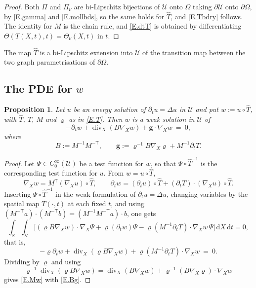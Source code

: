 \documentclass[10pt,a4paper]{amsart}
\numberwithin{equation}{section}
\DeclareMathOperator{\divg}{div}
\newcommand{\R}{\mathbb R}
\newcommand{\br}[1]{\left(#1\right)}
\newcommand{\om}{\Omega}
\newcommand{\pom}{\partial\Omega}
\newcommand{\pd}{\partial}
\newcommand{\Uc}{\mathcal U}
\renewcommand{\d}{\,\mathrm d}
\newtheorem{proposition}[equation]{Proposition}
\begin{document}
\begin{proof}
Both $\Pi$ and $\Pi_\nu$ are bi-Lipschitz bijections of $\Uc$ onto $\om$ taking
$\pd\Uc$ onto $\pom$, by \eqref{E.gamma} and \eqref{E.mollbds}, so the same
holds for $\widehat T$, and \eqref{E.Tbdry} follows. The identity for $M$ is the chain
rule, and \eqref{E.dtT} is obtained by differentiating
$\Theta\br{T(X,t),t}=\Theta_\nu(X,t)$ in $t$.
\end{proof}

\noindent The map $\widehat T$ is a bi-Lipschitz extension into $\Uc$ of the transition
map between the two graph parametrisations of $\pom$.

\subsection{The PDE for $w$}\label{ss.pde}

\begin{proposition}\label{P.pde}
Let $u$ be an energy solution of $\pd_tu=\Delta u$ in $\Uc$ and put
$w:=u\circ\widehat T$, with $\widehat T$, $T$, $M$ and $\varrho$ as in
\eqref{E.T}. Then $w$ is a weak solution in $\Uc$ of
\begin{equation}\label{E.Mw}
  -\pd_tw+\divg_X\br{B\nabla_Xw}+\mathbf g\cdot\nabla_Xw\ =\ 0 ,
\end{equation}
where
\begin{equation}\label{E.Bg}
  B:=M^{-1}M^{-\mathsf T},\qquad
  \mathbf g:=\varrho^{-1}B\nabla_X\varrho+M^{-1}\pd_tT .
\end{equation}
\end{proposition}

\begin{proof}
Let $\Psi\in C^\infty_0(\Uc)$ be a test function for $w$, so that
$\Psi\circ\widehat T^{-1}$ is the corresponding test function for $u$. From
$w=u\circ\widehat T$,
$$\nabla_Xw=M^{\mathsf T}\br{\nabla_Xu}\circ\widehat T,\qquad
  \pd_tw=\br{\pd_tu}\circ\widehat T
  +\br{\pd_tT}\cdot\br{\nabla_Xu}\circ\widehat T .$$
Inserting $\Psi\circ\widehat T^{-1}$ in the weak formulation of
$\pd_tu=\Delta u$, changing
variables by the spatial map $T(\cdot,t)$ at each fixed $t$, and using
$\br{M^{-\mathsf T}a}\cdot\br{M^{-\mathsf T}b}
=\br{M^{-1}M^{-\mathsf T}a}\cdot b$, one gets
$$\int_\R\int_\Uc\Big[\br{\varrho B\nabla_Xw}\cdot\nabla_X\Psi
  +\varrho\br{\pd_tw}\Psi
  -\varrho\br{M^{-1}\pd_tT}\cdot\nabla_Xw\,\Psi\Big]\d X\d t=0 ,$$
that is,
$$-\varrho\pd_tw+\divg_X\br{\varrho B\nabla_Xw}
  +\varrho\br{M^{-1}\pd_tT}\cdot\nabla_Xw\ =\ 0 .$$
Dividing by $\varrho$ and using
$$\varrho^{-1}\divg_X\br{\varrho B\nabla_Xw}
  =\divg_X\br{B\nabla_Xw}+\varrho^{-1}\br{B\nabla_X\varrho}\cdot\nabla_Xw$$
gives \eqref{E.Mw} with \eqref{E.Bg}.
\end{proof}
\end{document}
